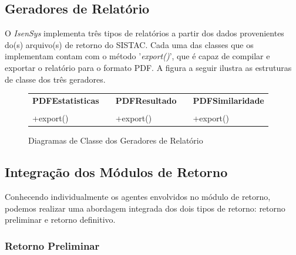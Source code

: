 \documentclass[
	12pt,			%
	openright,		%
	oneside,	
	a4paper,		%
	english,		%
	brazil			%
]{abntex2/abntex2}  %
\begin{document}
			\subsection{Geradores de Relatório}
	
				O \textit{IsenSys} implementa três tipos de relatórios a partir dos dados provenientes do(s) arquivo(s) de retorno do SISTAC. Cada uma das classes que os implementam contam com o método '\textit{export()}', que é capaz de compilar e exportar o relatório para o formato PDF. A figura a seguir ilustra as estruturas de classe dos três geradores.
	
				\begin{figure}[ht]
					\begin{center}
						
						\caption{Diagramas de Classe dos Geradores de Relatório}
						
						\begin{tabular}{|l|l|l|l|l|}
						\cline{1-1} \cline{3-3} \cline{5-5}
						\multicolumn{1}{|c|}{\textbf{PDFEstatisticas}} &  & \multicolumn{1}{c|}{\textbf{PDFResultado}} &  & \multicolumn{1}{c|}{\textbf{PDFSimilaridade}} \\ \cline{1-1} \cline{3-3} \cline{5-5} 
						&  &                                          &  &                                               \\ \cline{1-1} \cline{3-3} \cline{5-5} 
						+export()                                &  & +export()                                &  & +export()                                     \\ \cline{1-1} \cline{3-3} \cline{5-5} 
						\end{tabular}
						
					\end{center}
				\end{figure}
	
			\subsection{Integração dos Módulos de Retorno}
	
				Conhecendo individualmente os agentes envolvidos no módulo de retorno, podemos realizar uma abordagem integrada dos dois tipos de retorno: retorno preliminar e retorno definitivo.
	
				\subsubsection{Retorno Preliminar} \label{retorno-preliminar}
	
\end{document}
